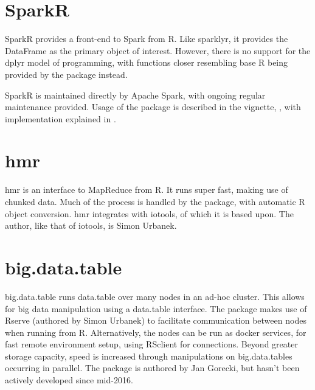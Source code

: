 \documentclass[10pt,a4paper]{article}
\begin{document}
\section{SparkR}
\label{sec:sparkr}

SparkR provides a front-end to Spark from
R\cite{venkataraman20:_spark}. Like sparklyr, it provides the
DataFrame as the primary object of interest. However, there is no
support for the dplyr model of programming, with functions closer
resembling base R being provided by the package instead.

SparkR is maintained directly by Apache Spark, with ongoing regular
maintenance provided. Usage of the package is described in the
vignette, \textcite{venktaraman19:_spark_pract_guide}, with
implementation explained in \textcite{venkataraman2016sparkr}.

\section{hmr}
\label{sec:hmr}

hmr is an interface to MapReduce from R\cite{urbanek20}. It runs super
fast, making use of chunked data. Much of the process is handled by
the package, with automatic R object conversion. hmr integrates with
iotools, of which it is based upon. The author, like that of iotools,
is Simon Urbanek.

\section{big.data.table}
\label{sec:big.data.table}

big.data.table runs data.table over many nodes in an ad-hoc
cluster\cite{gorecki16}. This allows for big data manipulation using a
data.table interface. The package makes use of Rserve (authored by
Simon Urbanek) to facilitate communication between nodes when running
from R. Alternatively, the nodes can be run as docker services, for
fast remote environment setup, using RSclient for connections. Beyond
greater storage capacity, speed is increased through manipulations on
big.data.tables occurring in parallel. The package is authored by Jan
Gorecki, but hasn't been actively developed since mid-2016.

\printbibliography{}
\end{document}
